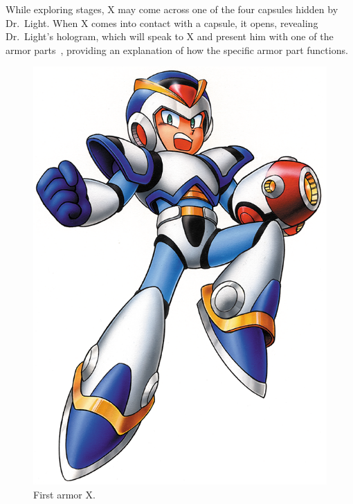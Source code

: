 While exploring stages, X may come across one of the four capsules hidden by Dr.~Light. When X comes into contact with a capsule, it opens, revealing Dr.~Light's hologram, which will speak to X and present him with one of the armor parts~\cite{wiki:First_armor}, providing an explanation of how the specific armor part functions. 
\begin{figure}[htp]
	\centering
	\includegraphics[height=\portraitsize]{figures/X1/First_armor.png}
	\caption{First armor X.}
\end{figure}


